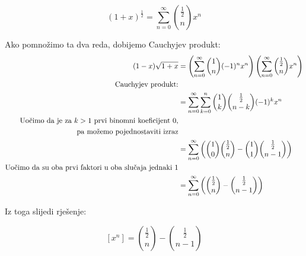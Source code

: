 \documentclass[exam.tex]{subfiles}
\begin{document}
	\[ (1 + x)^{\frac{1}{2}} = \sum\limits^\infty_{n=0} \binom{\frac{1}{2}}{n} x^n \]
	
	Ako pomnožimo ta dva reda, dobijemo Cauchyjev produkt:
	\begin{align*}
		(1 - x) \sqrt{1 + x} &= \left ( \sum\limits^\infty_{n=0} \binom{1}{n} (-1)^n x^n \right ) \left ( \sum\limits^\infty_{n=0} \binom{\frac{1}{2}}{n} x^n \right ) \\
		\text{Cauchyjev produkt:} \\
		&= \sum\limits^\infty_{n=0} \sum\limits^n_{k=0} \binom{1}{k} \binom{\frac{1}{2}}{n - k} (-1)^k x^n \\
		\text{Uočimo da je za \( k > 1 \) prvi binomni koeficijent 0,} \\
		\text{ pa možemo pojednostaviti izraz} \\
		&= \sum\limits^\infty_{n=0} \left ( \binom{1}{0} \binom{\frac{1}{2}}{n} - \binom{1}{1} \binom{\frac{1}{2}}{n - 1} \right ) \\
		\text{Uočimo da su oba prvi faktori u oba slučaja jednaki 1} \\
		&= \sum\limits^\infty_{n=0} \left ( \binom{\frac{1}{2}}{n} - \binom{\frac{1}{2}}{n - 1} \right ) \\
	\end{align*}
	
	Iz toga slijedi rješenje:
	
	\[ [x^n] = \binom{\frac{1}{2}}{n} - \binom{\frac{1}{2}}{n - 1} \]
\end{document}
